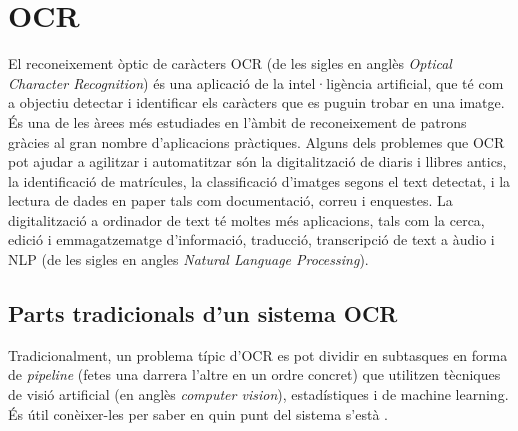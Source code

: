 \documentclass[12pt, spanish]{article}
\begin{document}
\section{OCR}

El reconeixement òptic de caràcters OCR (de les sigles en anglès \textit{Optical Character Recognition}) és una aplicació de la intel·ligència artificial, que té com a objectiu detectar i identificar els caràcters que es puguin trobar en una imatge. És una de les àrees més estudiades en l'àmbit de reconeixement de patrons gràcies al gran nombre d'aplicacions pràctiques. Alguns dels problemes que OCR pot ajudar a agilitzar i automatitzar són la digitalització de diaris i llibres antics, la identificació de matrícules, la classificació d'imatges segons el text detectat, i la lectura de dades en paper tals com documentació, correu i enquestes. La digitalització a ordinador de text té moltes més aplicacions, tals com la cerca, edició i emmagatzematge d'informació, traducció, transcripció de text a àudio i NLP (de les sigles en angles \textit{Natural Language Processing}).


\subsection{Parts tradicionals d'un sistema OCR}

Tradicionalment, un problema típic d'OCR es pot dividir en subtasques en forma de \textit{pipeline} (fetes una darrera l'altre en un ordre concret) que utilitzen tècniques de visió artificial (en anglès \textit{computer vision}), estadístiques i de machine learning. És útil conèixer-les per saber en quin punt del sistema s'està \cite{chaudhuri2017optical}.
\end{document}
